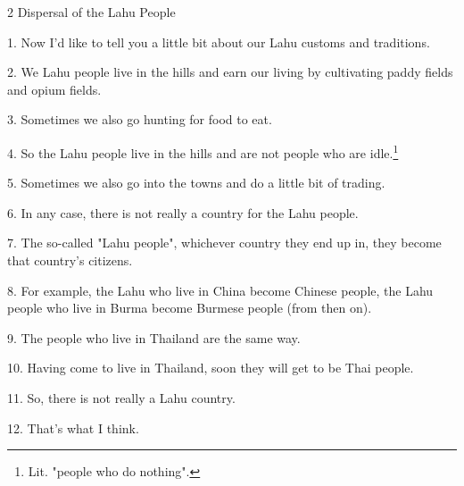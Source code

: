 
2 Dispersal of the Lahu People

1. Now I'd like to tell you a little bit about our Lahu customs and traditions.

2. We Lahu people live in the hills and earn our living by cultivating paddy fields
and opium fields.

3. Sometimes we also go hunting for food to eat.

4. So the Lahu people live in the hills and are not people who are idle.\footnote{Lit. "people who do nothing".}

5. Sometimes we also go into the towns and do a little bit of trading.

6. In any case, there is not really a country for the Lahu people.

7. The so-called "Lahu people", whichever country they end up
in, they become that country's citizens.

8. For example, the Lahu who live in China become Chinese people, the Lahu people
who live in Burma become Burmese people (from then on).

9. The people who live in Thailand are the same way.

10. Having come to live in Thailand, soon they will get to be Thai people.

11. So, there is not really a Lahu country.

12. That's what I think.

